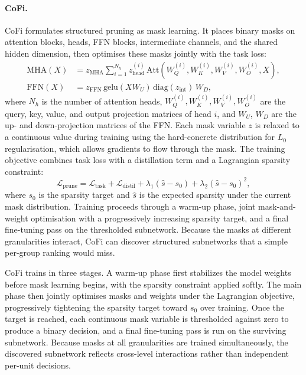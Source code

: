 \paragraph{CoFi.}
CoFi \cite{xia2022structured} formulates structured pruning as mask learning. It places binary masks on attention blocks, heads, FFN blocks, intermediate channels, and the shared hidden dimension, then optimises these masks jointly with the task loss:
\begin{align}
	\mathrm{MHA}(X) &= z_{\mathrm{MHA}} \sum_{i=1}^{N_h} z_{\mathrm{head}}^{(i)} \,\mathrm{Att}\!\left(W_Q^{(i)},W_K^{(i)},W_V^{(i)},W_O^{(i)},X\right), \\
	\mathrm{FFN}(X) &= z_{\mathrm{FFN}}\, \mathrm{gelu}(XW_U)\,\mathrm{diag}(z_{\mathrm{int}})\,W_D,
\end{align}
where $N_h$ is the number of attention heads, $W_Q^{(i)}, W_K^{(i)}, W_V^{(i)}, W_O^{(i)}$ are the query, key, value, and output projection matrices of head $i$, and $W_U$, $W_D$ are the up- and down-projection matrices of the FFN. Each mask variable $z$ is relaxed to a continuous value during training using the hard-concrete distribution for $L_0$ regularisation, which allows gradients to flow through the mask. The training objective combines task loss with a distillation term and a Lagrangian sparsity constraint:
\begin{equation}
	\mathcal{L}_{\mathrm{prune}}
	=
	\mathcal{L}_{\mathrm{task}}
	+
	\mathcal{L}_{\mathrm{distil}}
	+
	\lambda_1(\hat s - s_0)
	+
	\lambda_2(\hat s - s_0)^2,
\end{equation}
where $s_0$ is the sparsity target and $\hat{s}$ is the expected sparsity under the current mask distribution. Training proceeds through a warm-up phase, joint mask-and-weight optimisation with a progressively increasing sparsity target, and a final fine-tuning pass on the thresholded subnetwork. Because the masks at different granularities interact, CoFi can discover structured subnetworks that a simple per-group ranking would miss.

CoFi trains in three stages. A warm-up phase first stabilizes the model weights before mask learning begins, with the sparsity constraint applied softly. The main phase then jointly optimises masks and weights under the Lagrangian objective, progressively tightening the sparsity target toward $s_0$ over training. Once the target is reached, each continuous mask variable is thresholded against zero to produce a binary decision, and a final fine-tuning pass is run on the surviving subnetwork. Because masks at all granularities are trained simultaneously, the discovered subnetwork reflects cross-level interactions rather than independent per-unit decisions.

